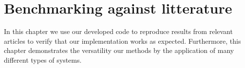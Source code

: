\chapter{Benchmarking against litterature}
    In this chapter we use our developed code to reproduce results from relevant
    articles to verify that our implementation works as expected.
    Furthermore, this chapter demonstrates the versatility our methods by the
    application of many different types of systems.
